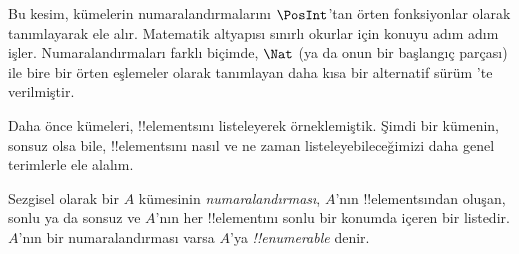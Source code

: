 



\begin{editorial}
  Bu kesim, kümelerin numaralandırmalarını $\PosInt$'tan örten fonksiyonlar
  olarak tanımlayarak ele alır. Matematik altyapısı sınırlı okurlar için
  konuyu adım adım işler. Numaralandırmaları farklı biçimde, $\Nat$ (ya da
  onun bir başlangıç parçası) ile bire bir örten eşlemeler olarak tanımlayan
  daha kısa bir alternatif sürüm 'te verilmiştir.
\end{editorial}

\begin{explain}
Daha önce kümeleri, !!{element}s{}ını listeleyerek örneklemiştik. Şimdi bir
kümenin, sonsuz olsa bile, !!{element}s{}ını nasıl ve ne zaman
listeleyebileceğimizi daha genel terimlerle ele alalım.
\end{explain}

\begin{defn}
Sezgisel olarak bir $A$ kümesinin \emph{numaralandırması}, $A$'nın
!!{element}s{}ından oluşan, sonlu ya da sonsuz ve $A$'nın her !!{element}{}ını
sonlu bir konumda içeren bir listedir. $A$'nın bir numaralandırması varsa
$A$'ya \emph{!!{enumerable}} denir.
\end{defn}

